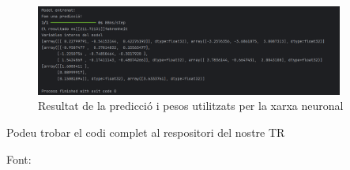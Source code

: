 \begin{figure}[H]
\centering
\includegraphics[width=0.9\textwidth]{./figures/13.png}
\caption{Resultat de la predicció i pesos utilitzats per la xarxa neuronal}
\end{figure}

Podeu trobar el codi complet al respositori del nostre TR~\cite{TR-RJ-2025}

Font: \cite{Xarxa_Neuronal}
